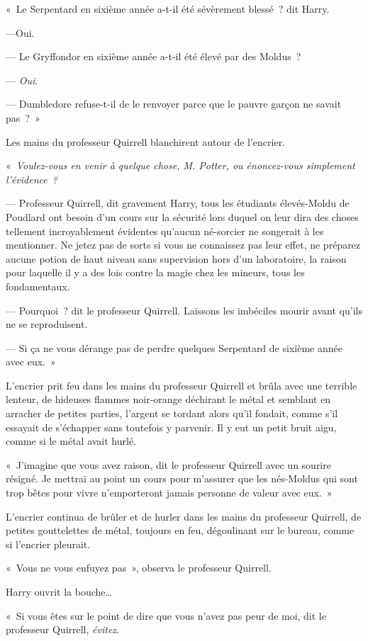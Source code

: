 «~Le Serpentard en sixième année a-t-il été sévèrement blessé~? dit Harry.

---Oui.

--- Le Gryffondor en sixième année a-t-il été élevé par des Moldus~?

--- \emph{Oui}.

--- Dumbledore refuse-t-il de le renvoyer parce que le pauvre garçon ne savait pas~?~»

Les mains du professeur Quirrell blanchirent autour de l'encrier.

«~\emph{Voulez-vous en venir à quelque chose, M. Potter, ou énoncez-vous simplement l'évidence~?}

--- Professeur Quirrell, dit gravement Harry, tous les étudiants élevés-Moldu de Poudlard ont besoin d'un cours sur la sécurité lors duquel on leur dira des choses tellement incroyablement évidentes qu'aucun né-sorcier ne songerait à les mentionner. Ne jetez pas de sorts si vous ne connaissez pas leur effet, ne préparez aucune potion de haut niveau sans supervision hors d'un laboratoire, la raison pour laquelle il y a des lois contre la magie chez les mineurs, tous les fondamentaux.

--- Pourquoi~? dit le professeur Quirrell. Laissons les imbéciles mourir avant qu'ils ne se reproduisent.

--- Si ça ne vous dérange pas de perdre quelques Serpentard de sixième année avec eux.~»

L'encrier prit feu dans les mains du professeur Quirrell et brûla avec une terrible lenteur, de hideuses flammes noir-orange déchirant le métal et semblant en arracher de petites parties, l'argent se tordant alors qu'il fondait, comme s'il essayait de s'échapper sans toutefois y parvenir. Il y eut un petit bruit aigu, comme si le métal avait hurlé.

«~J'imagine que vous avez raison, dit le professeur Quirrell avec un sourire résigné. Je mettrai au point un cours pour m'assurer que les nés-Moldus qui sont trop bêtes pour vivre n'emporteront jamais personne de valeur avec eux.~»

L'encrier continua de brûler et de hurler dans les mains du professeur Quirrell, de petites gouttelettes de métal, toujours en feu, dégoulinant sur le bureau, comme si l'encrier pleurait.

«~Vous ne vous enfuyez pas~», observa le professeur Quirrell.

Harry ouvrit la bouche…

«~Si vous êtes sur le point de dire que vous n'avez pas peur de moi, dit le professeur Quirrell, \emph{évitez}.

